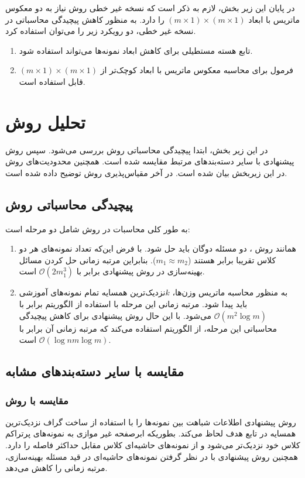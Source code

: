 در پایان این زیر بخش، لازم به ذکر است که نسخه غیر خطی روش  نیاز به دو معکوس ماتریس با ابعاد  $(m \times 1) \times (m \times 1)$ را دارد. به منظور کاهش پیچیدگی محاسباتی در نسخه غیر خطی، دو رویکرد زیر را می‌توان استفاده کرد.
\begin{enumerate}
	\item تابع هسته مستطیلی \cite{mang2001} برای کاهش ابعاد نمونه‌ها می‌تواند استفاده شود.
	\item فرمول  برای محاسبه معکوس ماتریس با ابعاد کوچک‌تر از $(m \times 1) \times (m \times 1)$  قابل استفاده است.
\end{enumerate}

\section{تحلیل روش }\label{sec:4:6}
در این زیر بخش، ابتدا پیچیدگی محاسباتی روش  بررسی می‌شود. سپس روش پیشنهادی با سایر دسته‌بندهای مرتبط مقایسه شده است. همچنین محدودیت‌های روش  در این زیربخش بیان شده است. در آخر مقیاس‌پذیری روش  توضیح داده شده است.
\subsection{پیچیدگی محاسباتی روش }\label{sec:4:6:1}
به طور کلی محاسبات در روش  شامل دو مرحله است:
\begin{enumerate}
	\item همانند روش ، دو مسئله دوگان باید حل شود. با فرض این‌که تعداد نمونه‌های هر دو کلاس تقریبا برابر هستند ($m_{1} \approx m_{2}$). بنابراین مرتبه زمانی حل کردن مسائل بهینه‌سازی در روش پیشنهادی برابر با $\mathcal{O}(2m^{3}_{1})$  است.
	\item به منظور محاسبه ماتریس وزن‌ها،   $k$نزدیک‌ترین همسایه تمام نمونه‌های آموزشی باید پیدا شود. مرتبه زمانی این مرحله با استفاده از الگوریتم  برابر با  $\mathcal{O}(m^{2}\log{m})$ می‌شود. با این حال روش پیشنهادی برای کاهش پیچیدگی محاسباتی این مرحله، از الگوریتم  استفاده می‌کند که مرتبه زمانی آن برابر با  $\mathcal{O}(\log{n}m\log{m})$ است.
\end{enumerate}

\subsection{مقایسه با سایر دسته‌بندهای مشابه}\label{sec:4:6:2}
\subsubsection{مقایسه با روش }\label{sec:4:6:2:1}
روش پیشنهادی  اطلاعات شباهت بین نمونه‌ها را با استفاده از ساخت گراف نزدیک‌ترین همسایه در تابع هدف لحاظ می‌کند. بطوریکه ابرصفحه غیر موازی به نمونه‌های پرتراکم کلاس خود نزدیک‌تر می‌شود و از نمونه‌های حاشیه‌ای کلاس مقابل حداکثر فاصله را دارد. همچنین روش پیشنهادی با در نظر گرفتن نمونه‌های حاشیه‌ای در قید مسئله بهینه‌سازی، مرتبه زمانی را کاهش می‌دهد.

